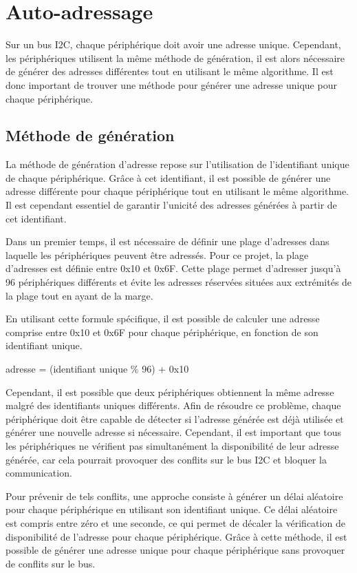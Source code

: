 \section{Auto-adressage}

Sur un bus I2C, chaque périphérique doit avoir une adresse unique.
Cependant, les périphériques utilisent la même méthode de génération, il est alors nécessaire de générer des adresses différentes tout en utilisant le même algorithme.
Il est donc important de trouver une méthode pour générer une adresse unique pour chaque périphérique.

\subsection{Méthode de génération}

La méthode de génération d'adresse repose sur l'utilisation de l'identifiant unique de chaque périphérique.
Grâce à cet identifiant, il est possible de générer une adresse différente pour chaque périphérique tout en utilisant le même algorithme.
Il est cependant essentiel de garantir l'unicité des adresses générées à partir de cet identifiant.

Dans un premier temps, il est nécessaire de définir une plage d'adresses dans laquelle les périphériques peuvent être adressés.
Pour ce projet, la plage d'adresses est définie entre 0x10 et 0x6F.
Cette plage permet d'adresser jusqu'à 96 périphériques différents et évite les adresses réservées situées aux extrémités de la plage tout en ayant de la marge.

En utilisant cette formule spécifique, il est possible de calculer une adresse comprise entre 0x10 et 0x6F pour chaque périphérique, en fonction de son identifiant unique.

\begin{center}
    adresse = (identifiant unique \% 96) + 0x10
\end{center}

Cependant, il est possible que deux périphériques obtiennent la même adresse malgré des identifiants uniques différents.
Afin de résoudre ce problème, chaque périphérique doit être capable de détecter si l'adresse générée est déjà utilisée et générer une nouvelle adresse si nécessaire.
Cependant, il est important que tous les périphériques ne vérifient pas simultanément la disponibilité de leur adresse générée, car cela pourrait provoquer des conflits sur le bus I2C et bloquer la communication.

Pour prévenir de tels conflits, une approche consiste à générer un délai aléatoire pour chaque périphérique en utilisant son identifiant unique.
Ce délai aléatoire est compris entre zéro et une seconde, ce qui permet de décaler la vérification de disponibilité de l'adresse pour chaque périphérique.
Grâce à cette méthode, il est possible de générer une adresse unique pour chaque périphérique sans provoquer de conflits sur le bus.

